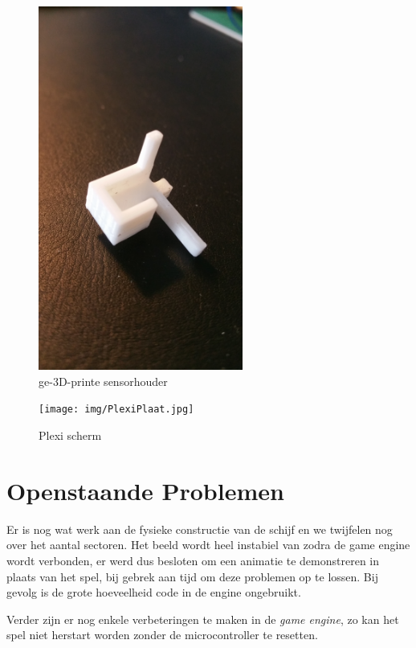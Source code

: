 \documentclass[12pt]{ugentreport}
\begin{document}
\begin{figure}
  \centering
  \includegraphics[width=0.6\textwidth]{img/SensorHouder.jpg}
  \caption{ge-3D-printe sensorhouder}
  \label{fig:sensorhouder}
\end{figure}

\begin{figure}
  \centering
  \texttt{[image: img/PlexiPlaat.jpg]}
  \caption{Plexi scherm}
  \label{fig:plexiplaat}
\end{figure}

\section{Openstaande Problemen}
Er is nog wat werk aan de fysieke constructie van de schijf en we twijfelen nog
over het aantal sectoren. Het beeld wordt heel instabiel van zodra de game
engine wordt verbonden, er werd dus besloten om een animatie te demonstreren in
plaats van het spel, bij gebrek aan tijd om deze problemen op te lossen.
Bij gevolg is de grote hoeveelheid code in de engine ongebruikt.

Verder zijn er nog enkele verbeteringen te maken in de \emph{game engine},
zo kan het spel niet herstart worden zonder de microcontroller te resetten.
\end{document}
